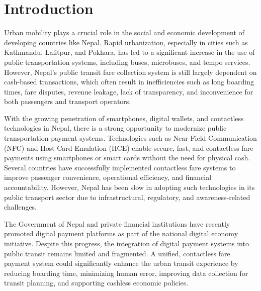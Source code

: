 \documentclass[sigconf, nonacm]{acmart}
\begin{document}

\maketitle

\section{Introduction}
Urban mobility plays a crucial role in the social and economic development of developing countries like Nepal. Rapid urbanization, especially in cities such as Kathmandu, Lalitpur, and Pokhara, has led to a significant increase in the use of public transportation systems, including buses, microbuses, and tempo services. However, Nepal’s public transit fare collection system is still largely dependent on cash-based transactions, which often result in inefficiencies such as long boarding times, fare disputes, revenue leakage, lack of transparency, and inconvenience for both passengers and transport operators.

With the growing penetration of smartphones, digital wallets, and contactless technologies in Nepal, there is a strong opportunity to modernize public transportation payment systems. Technologies such as Near Field Communication (NFC) and Host Card Emulation (HCE) enable secure, fast, and contactless fare payments using smartphones or smart cards without the need for physical cash. Several countries have successfully implemented contactless fare systems to improve passenger convenience, operational efficiency, and financial accountability. However, Nepal has been slow in adopting such technologies in its public transport sector due to infrastructural, regulatory, and awareness-related challenges.

The Government of Nepal and private financial institutions have recently promoted digital payment platforms as part of the national digital economy initiative. Despite this progress, the integration of digital payment systems into public transit remains limited and fragmented. A unified, contactless fare payment system could significantly enhance the urban transit experience by reducing boarding time, minimizing human error, improving data collection for transit planning, and supporting cashless economic policies.
\end{document}
